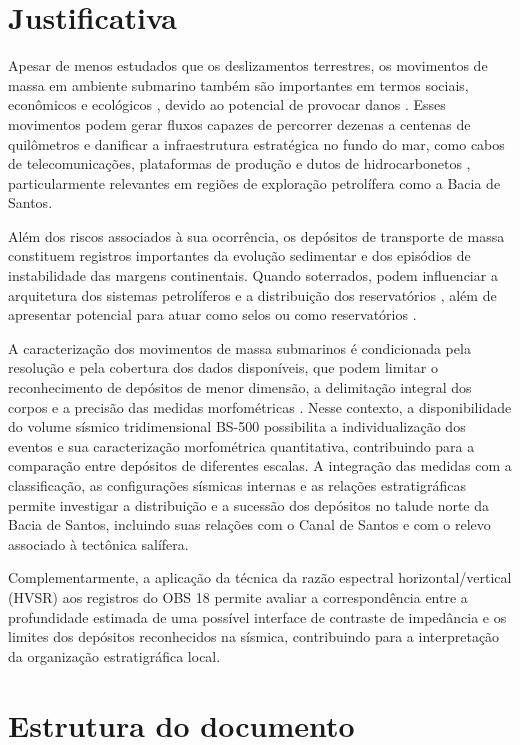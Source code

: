 \section{Justificativa}\label{sec:1-2}

Apesar de menos estudados que os deslizamentos terrestres, os movimentos de massa em ambiente submarino também são importantes em termos sociais, econômicos e ecológicos \cite{clare2018}, devido ao potencial de provocar danos \cite{vanneste2014}. Esses movimentos podem gerar fluxos capazes de percorrer dezenas a centenas de quilômetros e danificar a infraestrutura estratégica no fundo do mar, como cabos de telecomunicações, plataformas de produção e dutos de hidrocarbonetos \cite{pope2017}, particularmente relevantes em regiões de exploração petrolífera como a Bacia de Santos.

Além dos riscos associados à sua ocorrência, os depósitos de transporte de massa constituem registros importantes da evolução sedimentar e dos episódios de instabilidade das margens continentais. Quando soterrados, podem influenciar a arquitetura dos sistemas petrolíferos e a distribuição dos reservatórios \cite{kneller2016}, além de apresentar potencial para atuar como selos \cite{cardona2016} ou como reservatórios \cite{meckel2011}.

A caracterização dos movimentos de massa submarinos é condicionada pela resolução e pela cobertura dos dados disponíveis, que podem limitar o reconhecimento de depósitos de menor dimensão, a delimitação integral dos corpos e a precisão das medidas morfométricas \cite{clare2018}. Nesse contexto, a disponibilidade do volume sísmico tridimensional BS-500 possibilita a individualização dos eventos e sua caracterização morfométrica quantitativa, contribuindo para a comparação entre depósitos de diferentes escalas. A integração das medidas com a classificação, as configurações sísmicas internas e as relações estratigráficas permite investigar a distribuição e a sucessão dos depósitos no talude norte da Bacia de Santos, incluindo suas relações com o Canal de Santos e com o relevo associado à tectônica salífera.

Complementarmente, a aplicação da técnica da razão espectral horizontal/vertical (HVSR) aos registros do OBS 18 permite avaliar a correspondência entre a profundidade estimada de uma possível interface de contraste de impedância e os limites dos depósitos reconhecidos na sísmica, contribuindo para a interpretação da organização estratigráfica local.

\section{Estrutura do documento}\label{sec:1-3}

